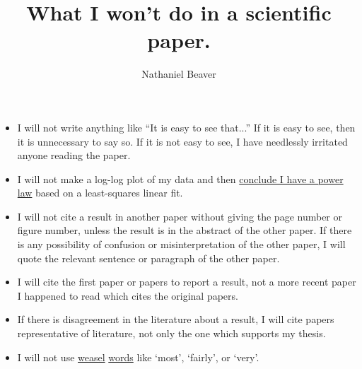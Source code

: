 \documentclass[12pt,letterpaper]{article}
\author{Nathaniel Beaver}
\title{What I won't do in a scientific paper.}
\begin{document}
\maketitle

\begin{itemize}
\item I will not write anything like ``It is easy to see that...'' If it is easy to see, then it is unnecessary to say so. If it is not easy to see, I have needlessly irritated anyone reading the paper.
\item I will not make a log-log plot of my data and then \href{http://vserver1.cscs.lsa.umich.edu/~crshalizi/notebooks/power-laws.html}{conclude I have a power law} based on a least-squares linear fit. 
\item I will not cite a result in another paper without giving the page number or figure number, unless the result is in the abstract of the other paper. If there is any possibility of confusion or misinterpretation of the other paper, I will quote the relevant sentence or paragraph of the other paper.
\item I will cite the first paper or papers to report a result, not a more recent paper I happened to read which cites the original papers.
\item If there is disagreement in the literature about a result, I will cite papers representative of literature, not only the one which supports my thesis.
\item I will not use \href{http://matt.might.net/articles/shell-scripts-for-passive-voice-weasel-words-duplicates/}{weasel} \href{http://en.wikipedia.org/wiki/Weasel_words}{words} like `most', `fairly', or `very'.
\end{itemize}
\end{document}
